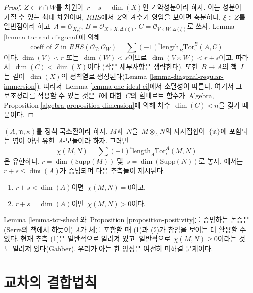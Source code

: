 \begin{proof}
\medskip\noindent
$Z \subset V \cap W$를 차원이\  $r + s - \dim(X)$인 기약성분이라 하자.
이는 성분이 가질 수 있는 최대 차원이며, $RHS$에서\  $Z$의 계수가 영임을
보이면 충분하다. $\xi \in Z$를 일반점이라 하고\ 
$A = \mathcal{O}_{X, \xi}$,
$B = \mathcal{O}_{X \times X, \Delta(\xi)}$,
$C = \mathcal{O}_{V \times W, \Delta(\xi)}$로 쓰자.
Lemma \ref{lemma-tor-and-diagonal}에 의해
$$
\text{coeff of }Z\text{ in }
RHS(\mathcal{O}_V, \mathcal{O}_W) = 
\sum (-1)^i
\text{length}_B \text{Tor}_i^B(A, C)
$$
이다. $\dim(V) < r$ 또는\  $\dim(W) < s$이므로\ 
$\dim(V \times W) < r + s$이고, 따라서\  $\dim(C) < \dim(X)$이다
(작은 세부사항은 생략한다). 또한\  $B \to A$의 핵\  $I$는 길이\ 
$\dim(X)$의 정칙열로 생성된다(Lemma
\ref{lemma-diagonal-regular-immersion}). 따라서\ 
Lemma \ref{lemma-one-ideal-ci}에서 소멸성이 따른다. 여기서 그 보조정리를
적용할 수 있는 것은\  $I$에 대한\  $C$의 힐베르트 함수가\  Algebra, Proposition
\ref{algebra-proposition-dimension}에 의해 차수\  $\dim(C) < n$을 갖기 때문이다.
\end{proof}

\begin{remark}
\label{remark-Serre-conjectures}
$(A, \mathfrak m, \kappa)$를 정칙 국소환이라 하자.
$M$과\  $N$을\  $M \otimes_A N$의 지지집합이\  $\{\mathfrak m\}$에 포함되는
영이 아닌 유한\  $A$-모듈이라 하자. 그러면
$$
\chi(M, N) = \sum (-1)^i \text{length}_A \text{Tor}_i^A(M, N)
$$
은 유한하다. $r = \dim(\text{Supp}(M))$ 및\ 
$s = \dim(\text{Supp}(N))$로 놓자. \cite{Serre_algebre_locale}에서는\ 
$r + s \leq \dim(A)$가 증명되며 다음 추측들이 제시된다.
\begin{enumerate}
\item $r + s < \dim(A)$이면\  $\chi(M, N) = 0$이고,
\item $r + s = \dim(A)$이면\  $\chi(M, N) > 0$이다.
\end{enumerate}
Lemma \ref{lemma-tor-sheaf}와\  Proposition \ref{proposition-positivity}를
증명하는 논증은 (Serre의 책에서 하듯이) $A$가 체를 포함할 때 (1)과 (2)가
참임을 보이는 데 활용할 수 있다. 현재 추측 (1)은 일반적으로 알려져 있고,
일반적으로\  $\chi(M, N) \geq 0$이라는 것도 알려져 있다(Gabber).
우리가 아는 한 양성은 여전히 미해결 문제이다.
\end{remark}



\section{교차의 결합법칙}
\label{section-associative}

